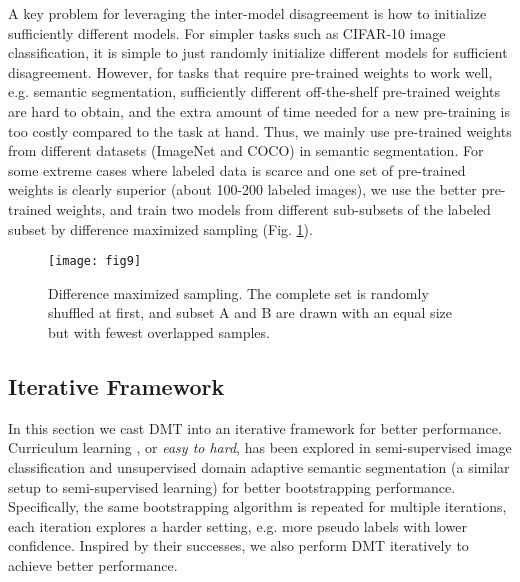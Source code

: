 \documentclass[preprint,review,10pt]{elsarticle}
\begin{document}
A key problem for leveraging the inter-model disagreement is how to initialize sufficiently different models. For simpler tasks such as CIFAR-10 image classification, it is simple to just randomly initialize different models for sufficient disagreement. However, for tasks that require pre-trained weights to work well, e.g. semantic segmentation, sufficiently different off-the-shelf pre-trained weights are hard to obtain, and the extra amount of time needed for a new pre-training is too costly compared to the task at hand. Thus, we mainly use pre-trained weights from different datasets (ImageNet and COCO) in semantic segmentation. For some extreme cases where labeled data is scarce and one set of pre-trained weights is clearly superior (about 100-200 labeled images), we use the better pre-trained weights, and train two models from different sub-subsets of the labeled subset by difference maximized sampling (Fig. \ref{fig9}). 

\begin{figure}[t]
\centering
\texttt{[image: fig9]}
\caption{Difference maximized sampling. The complete set is randomly shuffled at first, and subset A and B are drawn with an equal size but with fewest overlapped samples. }
\label{fig9}
\end{figure}


\subsection{Iterative Framework}
\label{sec:42}

In this section we cast DMT into an iterative framework for better performance. Curriculum learning \cite{bengio2009curriculum}, or \textit{easy to hard}, has been explored in semi-supervised image classification \cite{cascante2020curriculum} and unsupervised domain adaptive semantic segmentation (a similar setup to semi-supervised learning) \cite{cbst} for better bootstrapping performance. Specifically, the same bootstrapping algorithm is repeated for multiple iterations, each iteration explores a harder setting, e.g. more pseudo labels with lower confidence. Inspired by their successes, we also perform DMT iteratively to achieve better performance.

\BlankLine

\end{document}
